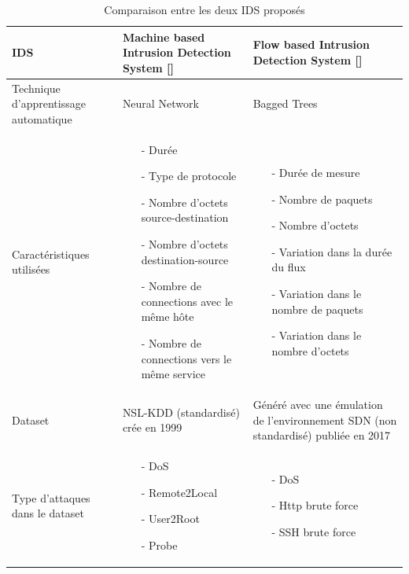 \begin{table}[h]
\begin{center}
\begin{tabular}{  | m{4cm} | m{5cm} | m{5cm} | }
\hline
IDS & Machine based Intrusion Detection System [\cite{10}] & Flow based Intrusion Detection System [\cite{8}]\\
\hline
Technique d’apprentissage automatique & Neural Network & Bagged Trees\\
\hline
Caractéristiques utilisées & \begin{itemize}
\item[-] Durée
\item[-] Type de protocole
\item[-] Nombre d’octets source-destination
\item[-] Nombre d’octets destination-source
\item[-] Nombre de connections avec le même hôte
\item[-] Nombre de connections vers le même service
\end{itemize} &\begin{itemize}
\item[-] Durée de mesure
\item[-] Nombre de paquets
\item[-] Nombre d’octets
\item[-] Variation dans la durée du flux
\item[-] Variation dans le nombre de paquets
\item[-] Variation dans le nombre d’octets
\end{itemize} \\
\hline
Dataset & NSL-KDD (standardisé) crée en 1999 & Généré avec une émulation de l’environnement SDN (non standardisé) publiée en 2017 \\
\hline 
Type d’attaques dans le dataset  & \begin{itemize}
\item[-] DoS
\item[-] Remote2Local
\item[-] User2Root
\item[-] Probe
\end{itemize} &\begin{itemize}
\item[-] DoS
\item[-] Http brute force
\item[-] SSH brute force
\end{itemize}\\
\hline
\end{tabular}
\caption{Comparaison entre les deux IDS proposés}
\end{center}
\label{table:IDS}
\end{table}

